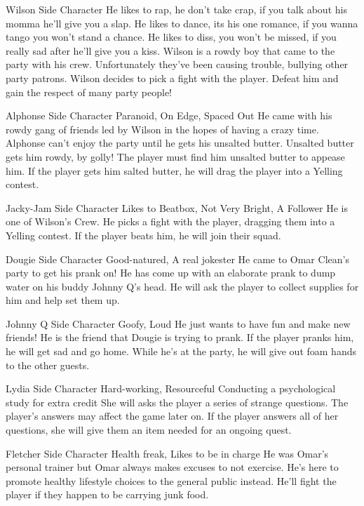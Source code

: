 {Wilson}
{Side Character}
{He likes to rap, he don't take crap, if you talk about his momma he'll give you a slap. He likes to dance, its his one romance, if you wanna tango you won't stand a chance. He likes to diss, you won't be missed, if you really sad after he'll give you a kiss.}
{Wilson is a rowdy boy that came to the party with his crew. Unfortunately they've been causing trouble, bullying other party patrons.}
{Wilson decides to pick a fight with the player. Defeat him and gain the respect of many party people!}

{Alphonse}
{Side Character}
{Paranoid, On Edge, Spaced Out}
{He came with his rowdy gang of friends led by Wilson in the hopes of having a crazy time.}
{Alphonse can't enjoy the party until he gets his unsalted butter. Unsalted butter gets him rowdy, by golly! The player must find him unsalted butter to appease him. If the player gets him salted butter, he will drag the player into a Yelling contest.}

{Jacky-Jam}
{Side Character}
{Likes to Beatbox, Not Very Bright, A Follower}
{He is one of Wilson's Crew.}
{He picks a fight with the player, dragging them into a Yelling contest. If the player beats him, he will join their squad.}

{Dougie}
{Side Character}
{Good-natured, A real jokester}
{He came to Omar Clean's party to get his prank on!}
{He has come up with an elaborate prank to dump water on his buddy Johnny Q's head. He will ask the player to collect supplies for him and help set them up.}

{Johnny Q}
{Side Character}
{Goofy, Loud}
{He just wants to have fun and make new friends!}
{He is the friend that Dougie is trying to prank. If the player pranks him, he will get sad and go home. While he's at the party, he will give out foam hands to the other guests.}

{Lydia}
{Side Character}
{Hard-working, Resourceful}
{Conducting a psychological study for extra credit}
{She will asks the player a series of strange questions. The player's answers may affect the game later on. If the player answers all of her questions, she will give them an item needed for an ongoing quest.}

{Fletcher}
{Side Character}
{Health freak, Likes to be in charge}
{He was Omar's personal trainer but Omar always makes excuses to not exercise. He's here to promote healthy lifestyle choices to the general public instead.}
{He'll fight the player if they happen to be carrying junk food.}

